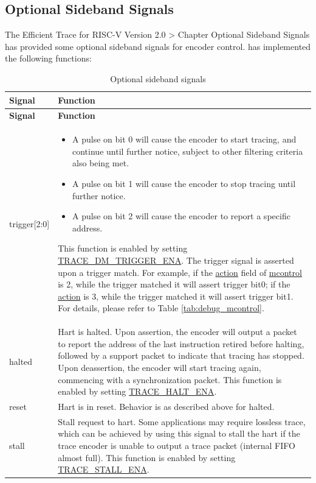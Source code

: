 \documentclass[main\_\_EN.tex]{subfiles}
\begin{document}
\subsection{Optional Sideband Signals}

The Efficient Trace for RISC-V Version 2.0 > Chapter Optional Sideband Signals has provided some optional sideband signals for encoder control. \chipname{} has implemented the following functions:

\begin{longtable}[c]{ |l|L{12cm}| }
    \caption{Optional sideband signals}
    \label{tab:sideband_signal}
    \\\hline{}
    \textbf{Signal} & \textbf{Function}  \\\hline
    \endfirsthead
    \hline{}
     \textbf{Signal} & \textbf{Function}  \\\hline
    \endhead
    \endfoot
    \endlastfoot

    trigger[2:0] &
        \begin{itemize}
            \item A pulse on bit 0 will cause the encoder to start tracing, and continue until further notice, subject to other filtering criteria also being met.
            \item A pulse on bit 1 will cause the encoder to stop tracing until further notice.
            \item A pulse on bit 2 will cause the encoder to report a specific address.
        \end{itemize}
        This function is enabled by setting \hyperref[fielddesc:TRACEDMTRIGGERENA]{TRACE\_DM\_TRIGGER\_ENA}. The trigger signal is asserted upon a  trigger match. For example, if the \hyperref[fielddesc:MCONTROLACTION]{action} field of \hyperref[regdesc:MCONTROL]{mcontrol} is 2, while the trigger matched it will assert trigger bit0; if the \hyperref[fielddesc:MCONTROLACTION]{action} is 3, while the trigger matched it will assert trigger bit1. For details, please refer to Table \ref{tab:debug_mcontrol}.\\\hline

    halted & Hart is halted. Upon assertion, the encoder will output a packet to report the address of the last instruction retired before halting, followed by a support packet to indicate that tracing has stopped. Upon deassertion, the encoder will start tracing again, commencing with a synchronization packet. This function is enabled by setting \hyperref[fielddesc:TRACEHALTENA]{TRACE\_HALT\_ENA}. \\\hline

    reset & Hart is in reset. Behavior is as described above for halted. \\\hline

    stall & Stall request to hart. Some applications may require lossless trace, which can be achieved by using this signal to stall the hart if the trace encoder is unable to output a trace packet (internal FIFO almost full). This function is enabled by setting \hyperref[fielddesc:TRACESTALLENA]{TRACE\_STALL\_ENA}. \\\hline

\end{longtable}
\end{document}
